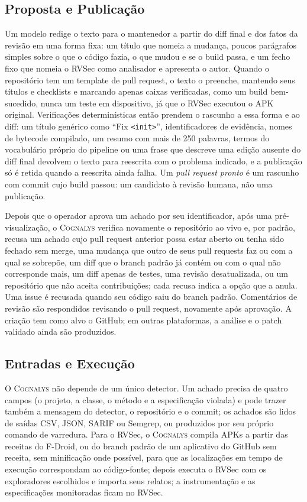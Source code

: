 \documentclass[conference]{IEEEtran}
\newcommand{\system}{\textsc{Cognalys}}
\begin{document}
\subsection{Proposta e Publicação}

Um modelo redige o texto para o mantenedor a partir do diff final e dos fatos da revisão em uma forma
fixa: um título que nomeia a mudança, poucos parágrafos simples sobre o que o
código fazia, o que mudou e se o build passa, e um fecho fixo que nomeia o
RVSec como analisador e apresenta o autor. Quando o repositório tem um template
de pull request, o texto o preenche, mantendo seus títulos e checklists e
marcando apenas caixas verificadas, como um build bem-sucedido, nunca um teste
em dispositivo, já que o RVSec executou o APK original. Verificações
determinísticas então prendem o rascunho a essa forma e ao diff: um título
genérico como ``Fix \texttt{<init>}'', identificadores de evidência, nomes de
bytecode compilado, um resumo com mais de 250 palavras, termos do vocabulário
próprio do pipeline ou uma frase que descreve uma edição
ausente do diff final devolvem o texto para reescrita com o problema indicado,
e a publicação só é retida quando a reescrita ainda falha. Um \emph{pull request pronto} é um rascunho com commit
cujo build passou: um candidato à revisão humana, não uma publicação.

Depois que o operador aprova um achado por seu identificador, após uma
pré-visualização, o \system{} verifica novamente o repositório ao vivo e, por
padrão, recusa um achado cujo pull request anterior possa estar aberto ou tenha
sido fechado sem merge, uma mudança que outro de seus pull requests faz ou com a
qual se sobrepõe, um diff que o branch padrão já contém ou com o qual não
corresponde mais, um diff apenas de testes, uma revisão desatualizada, ou um
repositório que não aceita contribuições; cada recusa indica a opção que a
anula. Uma issue é recusada quando seu código saiu do branch padrão.
Comentários de revisão são respondidos revisando o pull request, novamente após
aprovação. A criação tem como alvo o GitHub; em outras plataformas, a análise e
o patch validado ainda são produzidos.

\subsection{Entradas e Execução}

O \system{} não depende de um único detector. Um achado precisa de quatro campos
(o projeto, a classe, o método e a especificação violada) e pode trazer também a
mensagem do detector, o repositório e o commit; os achados são lidos de saídas
CSV, JSON, SARIF ou Semgrep, ou produzidos por seu próprio comando de varredura.
Para o RVSec, o \system{} compila APKs a partir das receitas do F-Droid, ou do branch
padrão de um aplicativo do GitHub sem receita, sem minificação onde possível,
para que as localizações em tempo de execução correspondam ao código-fonte;
depois executa o RVSec com os exploradores escolhidos e importa seus relatos; a
instrumentação e as especificações monitoradas ficam no RVSec.
\end{document}
